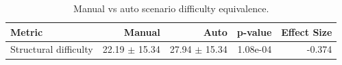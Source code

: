 \begin{table}[htbp]
\centering
\caption{Manual vs auto scenario difficulty equivalence.}
\label{tab:difficulty}
\begin{tabular}{lrrrr}
\toprule
Metric & Manual & Auto & p-value & Effect Size \\
\midrule
Structural difficulty & 22.19 $\pm$ 15.34 & 27.94 $\pm$ 15.34 & 1.08e-04 & -0.374 \\
\bottomrule
\end{tabular}
\end{table}
